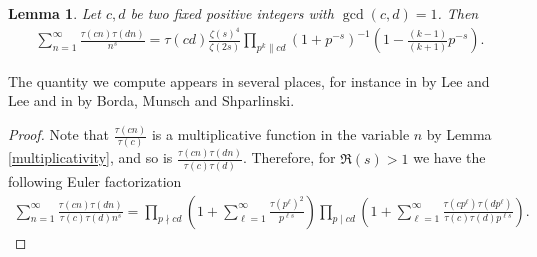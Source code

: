 \documentclass[a4paper,12pt, reqn0]{amsart}
\newtheorem{lemma}{Lemma}[section]
\theoremstyle{remark}
\begin{document}
\begin{lemma}
  \label{exactcomp}
  Let $c,d$ be two fixed positive integers with $\gcd(c,d)=1$. Then 
  \begin{align*}
    \sum_{n= 1}^\infty \frac{\tau(cn)\tau(dn)}{n^{s}}
    =\tau(cd)\frac{\zeta(s)^4}{\zeta(2s)}
    \prod_{p^{k}\| cd } \left(1+ p^{-s}\right)^{-1} \left(1-\tfrac{(k-1)}{(k+1)} p^{-s}\right).
  \end{align*}
\end{lemma}
The quantity we compute appears in several places, for instance in
\cite{Lee-Lee*19} by Lee and Lee and in \cite{Munsch-Shparlinski*23} by Borda, Munsch and Shparlinski.
\begin{proof}
  Note that $\frac{\tau(cn)}{\tau(c)}$ is a multiplicative function in the variable $n$ by Lemma \ref{multiplicativity}, and so is
  $\frac{\tau(cn)\tau(dn)}{\tau(c)\tau(d)}$.  Therefore, for
  $\Re(s)>1$ we have the following Euler factorization
  \begin{align*}
    \sum_{n= 1}^\infty \frac{\tau(cn)\tau(dn)} {\tau(c)\tau(d)n^{s}}
    =
    \prod_{p\nmid cd }
    \left(1 + \sum_{\ell= 1}^\infty \frac{\tau(p^\ell)^{2}}{p^{\ell s}} \right)
    \prod_{p\mid cd }
    \left(1 + \sum_{\ell= 1}^\infty
    \frac{\tau(cp^\ell)\tau(dp^\ell)}{\tau(c) \tau(d) p^{\ell s}} \right).
   \end{align*}
   
	
	

\end{proof}
\end{document}
